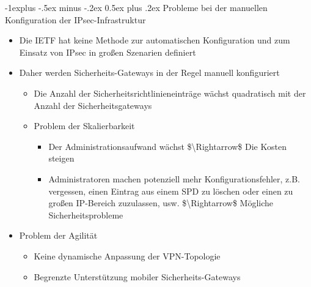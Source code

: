 \documentclass[a4paper]{article}
\makeatletter
\renewcommand{\subsection}{\@startsection{subsection}{2}{0mm}%
 {-1explus -.5ex minus -.2ex}%
 {0.5ex plus .2ex}%
 {\normalfont\normalsize\bfseries}}
\makeatother
\begin{document}
\begin{multicols}{3}
    \subsection{Probleme bei der manuellen Konfiguration der
        IPsec-Infrastruktur}

    \begin{itemize}
        \item
              Die IETF hat keine Methode zur automatischen Konfiguration und zum
              Einsatz von IPsec in großen Szenarien definiert
        \item
              Daher werden Sicherheits-Gateways in der Regel manuell konfiguriert

              \begin{itemize}
                  \item
                        Die Anzahl der Sicherheitsrichtlinieneinträge wächst quadratisch mit
                        der Anzahl der Sicherheitsgateways
                  \item
                        Problem der Skalierbarkeit

                        \begin{itemize}
                            \item
                                  Der Administrationsaufwand wächst \$\textbackslash Rightarrow\$
                                  Die Kosten steigen
                            \item
                                  Administratoren machen potenziell mehr Konfigurationsfehler, z.B.
                                  vergessen, einen Eintrag aus einem SPD zu löschen oder einen zu
                                  großen IP-Bereich zuzulassen, usw. \$\textbackslash Rightarrow\$
                                  Mögliche Sicherheitsprobleme
                        \end{itemize}
              \end{itemize}
        \item
              Problem der Agilität

              \begin{itemize}
                  \item
                        Keine dynamische Anpassung der VPN-Topologie
                  \item
                        Begrenzte Unterstützung mobiler Sicherheits-Gateways
              \end{itemize}
    \end{itemize}



\end{multicols}
\end{document}
